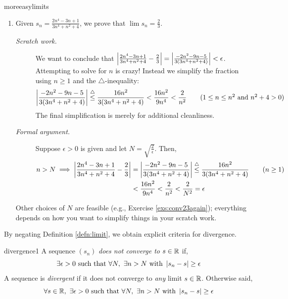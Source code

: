 \begin{examples}{}{moreeasylimits}
\begin{enumerate}
		\item\label{ex:conv3} Given $s_n=\frac{2n^4-3n+1}{3n^4+n^2+4}$, we prove that $\lim s_n=\frac 23$.
		\begin{description}
			\item[\normalfont\emph{Scratch work.}] We want to conclude that
			$\left| \frac{2n^4-3n+1}{3n^4+n^2+4}-\frac 23\right|=\left| \frac{-2n^2-9n-5}{3(3n^4+n^2+4)}\right|<\epsilon$. Attempting to solve for $n$ is crazy! Instead we simplify the fraction using  $n\ge 1$ and the $\triangle$-inequality:
			\[
				\left| \frac{-2n^2-9n-5}{3(3n^4+n^2+4)}\right| \overset\triangle\le\frac{16n^2}{3(3n^4+n^2+4)} <\frac{16n^2}{9n^4}<\frac 2{n^2} \tag{$1\le n\le n^2$ and $n^2+4>0$}
			\]
			The final simplification is merely for additional cleanliness.
	
			\item[\normalfont\emph{Formal argument.}] Suppose $\epsilon>0$ is given and let $N=\sqrt{\frac 2\epsilon}$. Then,
			\begin{align*}
				n>N\implies\left| \frac{2n^4-3n+1}{3n^4+n^2+4}-\frac 23\right|
				&=\left| \frac{-2n^2-9n-5}{3(3n^4+n^2+4)}\right| 
				\overset\triangle\le\frac{16n^2}{3(3n^4+n^2+4)} \tag{$n\ge 1$}\\
				&<\frac{16n^2}{9n^4}<\frac 2{n^2}
				<\frac 2{N^2}=\epsilon
			\end{align*}
		\end{description}
		
		Other choices of $N$ are feasible (e.g., Exercise \ref{exs:conv23again}); everything depends on how you want to simplify things in your scratch work.
		
	\end{enumerate}
\end{examples}


\goodbreak



By negating Definition \ref{defn:limit}, we obtain explicit criteria for divergence.

\begin{defn}{}{divergence1}
	A sequence $(s_n)$ \emph{does not converge to $s\in\mathbb{R}$} if,
	\[
		\exists \epsilon>0\ \text{such that}\ \forall N,\ \exists n>N\ \text{with}\ \nm{s_n-s}\ge\epsilon
	\]
	A sequence is \emph{divergent} if it does not converge to \emph{any} limit $s\in\mathbb{R}$. Otherwise said,
	\[
		\forall s\in\R,\ \exists \epsilon>0\ \text{such that}\ \forall N,\ \exists n>N\ \text{with}\ \nm{s_n-s}\ge\epsilon
	\]
\end{defn}



